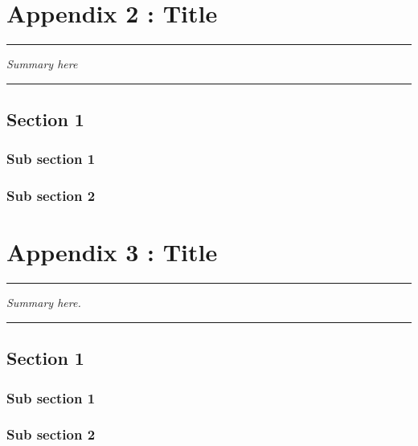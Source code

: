 \FloatBarrier
\chapter{Appendix 2 : Title}
\label{Ann:2}


\begin{center}
\rule{0.7\linewidth}{.5pt}
\begin{minipage}{0.7\linewidth}
\smallskip

\textit{Summary here
}

\end{minipage}
\smallskip
\rule{0.7\linewidth}{.5pt}
\end{center}

\minitoc
\newpage


\section{Section 1}
\subsection{Sub section 1}
\blindtext
\subsection{Sub section 2}
\blindtext



\FloatBarrier
\chapter{Appendix 3 : Title}
\label{Ann:3}


\begin{center}
\rule{0.7\linewidth}{.5pt}
\begin{minipage}{0.7\linewidth}
\smallskip

\textit{Summary here.
}

\end{minipage}
\smallskip
\rule{0.7\linewidth}{.5pt}
\end{center}

\minitoc
\newpage

\section{Section 1}
\subsection{Sub section 1}
\blindtext
\subsection{Sub section 2}
\blindtext
